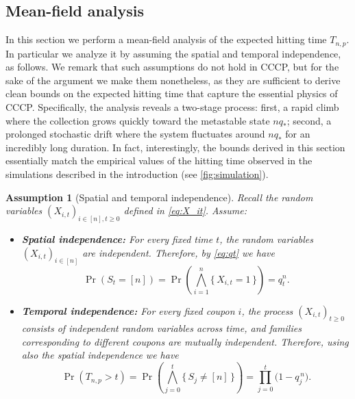 \documentclass[11pt,a4paper]{article}
\newtheorem{assumption}[theorem]{Assumption}
\begin{document}
\subsection{Mean-field analysis}\label{sec:mean field}

In this section we perform a mean-field analysis of the expected hitting time $T_{n,p}$. 
In particular we analyze it by assuming the spatial and temporal independence, as follows.
We remark that such assumptions do not hold in CCCP, but for the sake of the argument we make them nonetheless, as they are sufficient to derive clean bounds on the expected hitting time that capture the essential physics of CCCP.
Specifically, the analysis reveals a two-stage process: first, a rapid climb where the collection grows quickly toward the metastable state $nq_*$; second, a prolonged stochastic drift where the system fluctuates around $nq_*$ for an incredibly long duration.
In fact, interestingly, the bounds derived in this section essentially match the empirical values of the hitting time observed in the simulations described in the introduction (see \cref{fig:simulation}).

\begin{assumption}[Spatial and temporal independence]
Recall the random variables $(X_{i,t})_{i\in[n],t\ge 0}$ defined in \cref{eq:X_it}.
Assume:
\begin{itemize}\label{ass:spatial temporal independence}
    \item \textbf{Spatial independence:} For every fixed time $t$, the random variables $(X_{i,t})_{i\in[n]}$ are independent. Therefore, by \cref{eq:qt} we have
    \[
        \Pr(S_t = [n])
        = \Pr\left( \bigwedge_{i=1}^{n} \{\, X_{i,t}=1 \,\} \right)
        = q_t^n.
    \]
    \item \textbf{Temporal independence:} For every fixed coupon $i$, the process 
    \(
        (X_{i,t})_{t\ge 0}
    \)
    consists of independent random variables across time, and families corresponding to different coupons are mutually independent. Therefore, using also the spatial independence we have
    \[
        \Pr(T_{n,p} > t)
        = \Pr\left( \bigwedge_{j=0}^{t} \{\,S_j\neq[n]\,\} \right)
        = \prod_{j=0}^t \big(1 - q_j^{\,n}\big).
    \]
\end{itemize}
\end{assumption}
\end{document}
